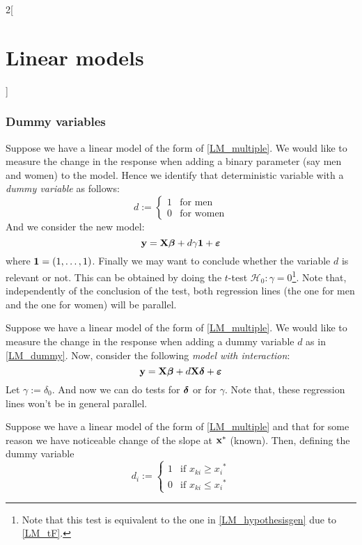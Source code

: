 \documentclass[../../../main_math.tex]{subfiles}
\begin{document}
\begin{multicols}{2}[\section{Linear models}]
  \subsubsection{Dummy variables}
  \begin{definition}
    Suppose we have a linear model of the form of \cref{LM_multiple}. We would like to measure the change in the response when adding a binary parameter (say men and women) to the model. Hence we identify that deterministic variable with a \emph{dummy variable} as follows:
    \begin{equation}\label{LM_dummy}
      d:=
      \begin{cases}
        1 & \text{for men}   \\
        0 & \text{for women}
      \end{cases}
    \end{equation}
    And we consider the new model: $$\boldsymbol{\mathrm{y}}=\boldsymbol{\mathrm{X}}\boldsymbol{\mathrm{\beta}}+d\gamma\boldsymbol{\mathrm{1}}+\boldsymbol{\mathrm{\varepsilon}}$$
    where $\boldsymbol{\mathrm{1}}=(1,\ldots,1)$. Finally we may want to conclude whether the variable $d$ is relevant or not. This can be obtained by doing the $t$-test $\mathcal{H}_0:\gamma=0$\footnote{Note that this test is equivalent to the one in \cref{LM_hypothesisgen} due to \cref{LM_tF}.}. Note that, independently of the conclusion of the test, both regression lines (the one for men and the one for women) will be parallel.
  \end{definition}
  \begin{definition}
    Suppose we have a linear model of the form of \cref{LM_multiple}. We would like to measure the change in the response when adding a dummy variable $d$ as in \cref{LM_dummy}. Now, consider the following \emph{model with interaction}: $$\boldsymbol{\mathrm{y}}=\boldsymbol{\mathrm{X}}\boldsymbol{\mathrm{\beta}}+d\boldsymbol{\mathrm{X}}\boldsymbol{\mathrm{\delta}}+\boldsymbol{\mathrm{\varepsilon}}$$
    Let $\gamma:=\delta_0$. And now we can do tests for $\boldsymbol{\mathrm{\delta}}$ or for $\gamma$. Note that, these regression lines won't be in general parallel.
  \end{definition}
  \begin{definition}
    Suppose we have a linear model of the form of \cref{LM_multiple} and that for some reason we have noticeable change of the slope at $\boldsymbol{\mathrm{x}}^*$ (known). Then, defining the dummy variable
    \begin{equation}
      d_i:=
      \begin{cases}
        1 & \text{if }x_{ki}\geq {x_i}^* \\
        0 & \text{if }x_{ki}\leq {x_i}^*

\end{cases}
\end{equation}
\end{definition}
\end{multicols}
\end{document}
